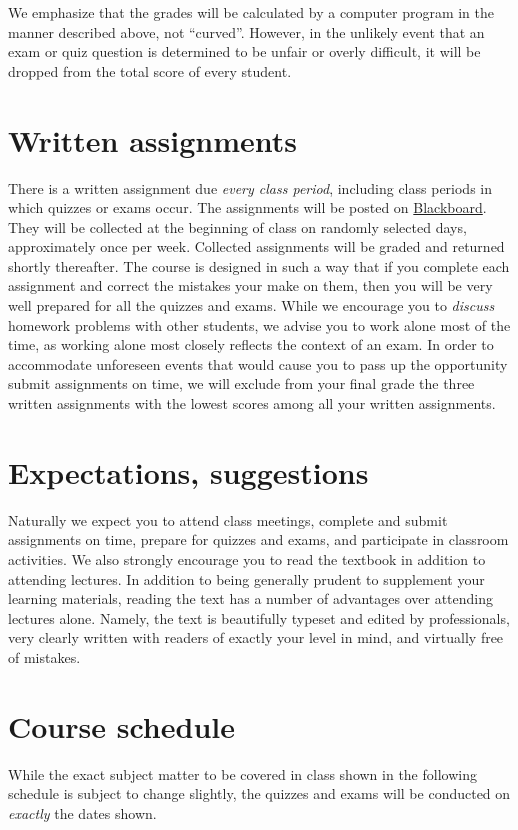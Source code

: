 \documentclass[11pt]{article}
\begin{document}
We emphasize that the grades will be calculated by a computer program in the manner described
above, not ``curved''. However, in the unlikely event that an exam or quiz question is determined
to be unfair or overly difficult, it will be dropped from the total score of
every student.

\section{Written assignments}\label{Written}
There is a written assignment due {\em every 
class period}, including class periods
in which quizzes or exams occur.
The assignments will be posted on \href{https://bb.its.iastate.edu}{Blackboard}.
They will be collected at the beginning
of class on randomly selected days, approximately
once per week. Collected assignments
will be graded and returned shortly thereafter.
The course is designed in such a way that if you complete each assignment and 
correct the mistakes your make on them,
then you will be very well prepared for all the quizzes and exams.
While we encourage you to {\em discuss} homework problems with other
students, we advise you to work alone most of the time,
as working alone most closely reflects the context of an exam.
In order to accommodate unforeseen events that would cause you
to pass up the opportunity submit assignments on time,
we will exclude from your final grade
the three written assignments with the lowest scores among
all your written assignments.

\section{Expectations, suggestions} Naturally we expect you to attend 
class meetings, complete and submit assignments on 
time, prepare for quizzes and exams, and participate in classroom 
activities. We also strongly encourage you to read the textbook
in addition to attending lectures.
In addition to being generally prudent to 
supplement your learning materials, reading the text has a number of 
advantages over attending lectures alone. Namely, the text is beautifully 
typeset and edited by professionals, very clearly written with readers 
of exactly your level in mind, and virtually free of mistakes.

\section{Course schedule}\label{Schedule} While the exact subject
matter to be covered in class shown in the following schedule is
subject to change slightly, the quizzes and exams will be conducted
on {\em exactly} the dates shown.
\end{document}
